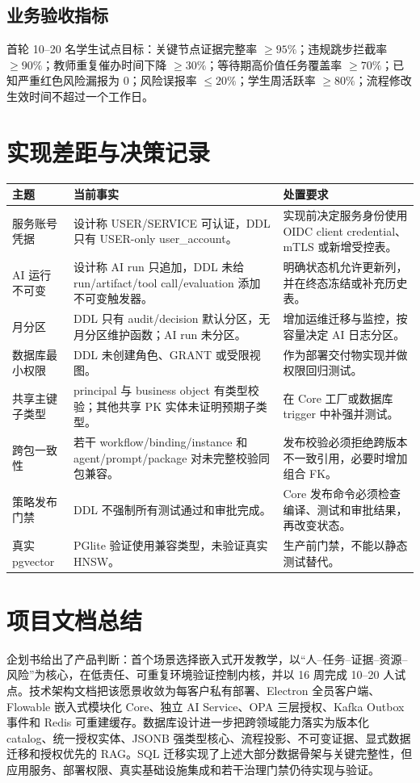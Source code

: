 \documentclass[journal,a4paper,onecolumn]{IEEEtran}
\begin{document}
\subsection{业务验收指标}
首轮 10--20 名学生试点目标：关键节点证据完整率 $\geq95\%$；违规跳步拦截率 $\geq90\%$；教师重复催办时间下降 $\geq30\%$；等待期高价值任务覆盖率 $\geq70\%$；已知严重红色风险漏报为 0；风险误报率 $\leq20\%$；学生周活跃率 $\geq80\%$；流程修改生效时间不超过一个工作日。

\section{实现差距与决策记录}
\begin{longtable}{p{}p{}p{}}
\toprule
主题 & 当前事实 & 处置要求 \\
\midrule
\endhead
服务账号凭据 & 设计称 USER/SERVICE 可认证，DDL 只有 USER-only user\_account。 & 实现前决定服务身份使用 OIDC client credential、mTLS 或新增受控表。\\
AI 运行不可变 & 设计称 AI run 只追加，DDL 未给 run/artifact/tool call/evaluation 添加不可变触发器。 & 明确状态机允许更新列，并在终态冻结或补充历史表。\\
月分区 & DDL 只有 audit/decision 默认分区，无月分区维护函数；AI run 未分区。 & 增加运维迁移与监控，按容量决定 AI 日志分区。\\
数据库最小权限 & DDL 未创建角色、GRANT 或受限视图。 & 作为部署交付物实现并做权限回归测试。\\
共享主键子类型 & principal 与 business object 有类型校验；其他共享 PK 实体未证明预期子类型。 & 在 Core 工厂或数据库 trigger 中补强并测试。\\
跨包一致性 & 若干 workflow/binding/instance 和 agent/prompt/package 对未完整校验同包兼容。 & 发布校验必须拒绝跨版本不一致引用，必要时增加组合 FK。\\
策略发布门禁 & DDL 不强制所有测试通过和审批完成。 & Core 发布命令必须检查编译、测试和审批结果，再改变状态。\\
真实 pgvector & PGlite 验证使用兼容类型，未验证真实 HNSW。 & 生产前门禁，不能以静态测试替代。\\
\bottomrule
\end{longtable}

\section{项目文档总结}
企划书给出了产品判断：首个场景选择嵌入式开发教学，以“人--任务--证据--资源--风险”为核心，在低责任、可重复环境验证控制内核，并以 16 周完成 10--20 人试点。技术架构文档把该愿景收敛为每客户私有部署、Electron 全员客户端、Flowable 嵌入式模块化 Core、独立 AI Service、OPA 三层授权、Kafka Outbox 事件和 Redis 可重建缓存。数据库设计进一步把跨领域能力落实为版本化 catalog、统一授权实体、JSONB 强类型核心、流程投影、不可变证据、显式数据迁移和授权优先的 RAG。SQL 迁移实现了上述大部分数据骨架与关键完整性，但应用服务、部署权限、真实基础设施集成和若干治理门禁仍待实现与验证。
\end{document}

